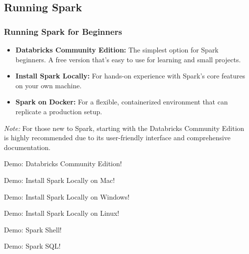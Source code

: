 \subsection{Running Spark}\label{subsec:running-spark}
\begin{frame}
    \frametitle{Running Spark for Beginners}

    \begin{itemize}
        \item \textbf{Databricks Community Edition:} The simplest option for Spark beginners. A free version that's easy to use for learning and small projects.
        \item \textbf{Install Spark Locally:} For hands-on experience with Spark's core features on your own machine.
        \item \textbf{Spark on Docker:} For a flexible, containerized environment that can replicate a production setup.
    \end{itemize}

    \bigskip %

    \emph{Note:} For those new to Spark, starting with the Databricks Community Edition is highly recommended due to its user-friendly interface and comprehensive documentation.

\end{frame}
\begin{frame}
    \centering
    \vfill
    \Large{Demo: Databricks Community Edition!}
    \vfill
\end{frame}

\begin{frame}
    \centering
    \vfill
    \Large{Demo: Install Spark Locally on Mac!}
    \vfill
\end{frame}

\begin{frame}
    \centering
    \vfill
    \Large{Demo: Install Spark Locally on Windows!}
    \vfill
\end{frame}

\begin{frame}
    \centering
    \vfill
    \Large{Demo: Install Spark Locally on Linux!}
    \vfill
\end{frame}

\begin{frame}
    \centering
    \vfill
    \Large{Demo: Spark Shell!}
    \vfill
\end{frame}

\begin{frame}
    \centering
    \vfill
    \Large{Demo: Spark SQL!}
    \vfill
\end{frame}

